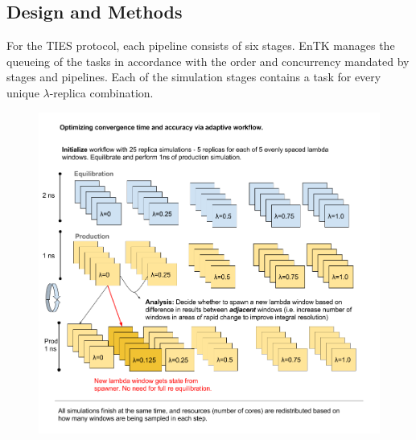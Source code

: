 \subsection*{Design and Methods}




For the TIES protocol, each pipeline consists of six stages. EnTK manages the
queueing of the tasks in accordance with the order and concurrency mandated by
stages and pipelines.  Each of the simulation stages contains a
task for every unique $\lambda$-replica combination.

\begin{figure}
  \centering
   \includegraphics[width=\columnwidth]{figures/Adaptive_TIES.png}
  \caption{}
\label{fig:weak_scaling}
\end{figure}

